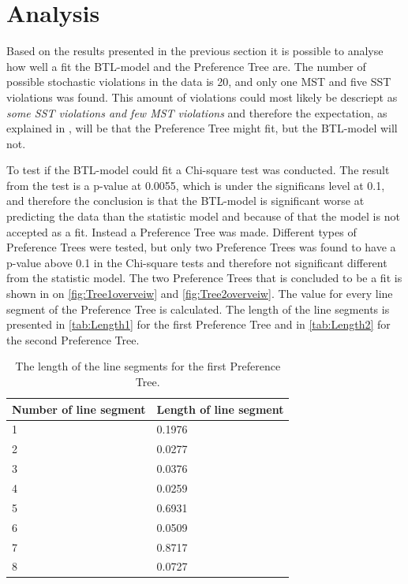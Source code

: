 \section*{Analysis}
\label{Analyse}
%
Based on the results presented in the previous section it is possible to analyse how well a fit the BTL-model and the Preference Tree are.\blankline
%
The number of possible stochastic violations in the data is 20, and only one MST and five SST violations was found. This amount of violations could most likely be descriept as \textit{some SST violations and few MST violations} and therefore the expectation, as explained in , will be that the Preference Tree might fit, but the BTL-model will not. 

To test if the BTL-model could fit a Chi-square test was conducted. The result from the test is a p-value at 0.0055, which is under the significans level at 0.1, and therefore the conclusion is that the BTL-model is significant worse at predicting the data than the statistic model and because of that the model is not accepted as a fit. Instead a Preference Tree was made.\blankline
%
Different types of Preference Trees were tested, but only two Preference Trees was found to have a p-value above 0.1 in the Chi-square tests and therefore not significant different from the statistic model. The two Preference Trees that is concluded to be a fit is shown in  on \autoref{fig:Tree1overveiw} and \autoref{fig:Tree2overveiw}. The value for every line segment of the Preference Tree is calculated. The length of the line segments is presented in \autoref{tab:Length1} for the first Preference Tree and in \autoref{tab:Length2} for the second Preference Tree.  
%
\begin{table}[H]
	\centering
	\begin{tabular}{@{}ll@{}}
		\toprule
		Number of line segment  & Length of line segment \\ \midrule
		1					    & 0.1976   \\
		2      				    & 0.0277   \\
		3      				    & 0.0376   \\
		4      					& 0.0259   \\
		5      					& 0.6931   \\
		6      					& 0.0509   \\
		7      					& 0.8717   \\
		8						& 0.0727   \\ \bottomrule
	\end{tabular}
	\caption{The length of the line segments for the first Preference Tree.}
	\label{tab:Length1}
\end{table} 
